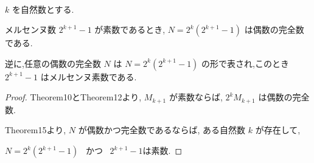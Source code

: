 \begin{theorem}\label{even_and_perfect_iff}
\leanok{}~\

\(k\) を自然数とする.

メルセンヌ数 \(2^{k+1} - 1\) が素数であるとき, \(N = 2^k(2^{k+1} - 1)\) は偶数の完全数である.

逆に,任意の偶数の完全数 \(N\) は \(N = 2^k(2^{k+1} - 1)\) の形で表され,このとき \(2^{k+1} - 1\) はメルセンヌ素数である.

\end{theorem}

\begin{proof}
Theorem10とTheorem12より, \(M_{k+1}\) が素数ならば, \(2^kM_{k+1}\) は偶数の完全数.

Theorem15より, \(N\) が偶数かつ完全数であるならば, ある自然数 \(k\) が存在して,

\(N = 2^k(2^{k+1} - 1)\) ~かつ~ \(2^{k+1} - 1 \text{は素数}\).
\end{proof}
